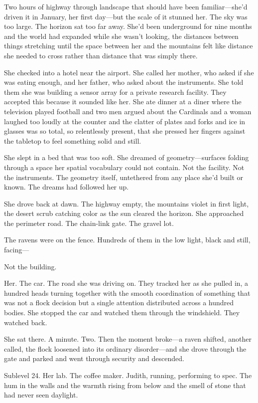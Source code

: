 \documentclass[12pt]{article}
\begin{document}
Two hours of highway through landscape that should have been familiar---she'd driven it in January, her first day---but the scale of it stunned her. The sky was too large. The horizon sat too far away. She'd been underground for nine months and the world had expanded while she wasn't looking, the distances between things stretching until the space between her and the mountains felt like distance she needed to cross rather than distance that was simply there.

She checked into a hotel near the airport. She called her mother, who asked if she was eating enough, and her father, who asked about the instruments. She told them she was building a sensor array for a private research facility. They accepted this because it sounded like her. She ate dinner at a diner where the television played football and two men argued about the Cardinals and a woman laughed too loudly at the counter and the clatter of plates and forks and ice in glasses was so total, so relentlessly present, that she pressed her fingers against the tabletop to feel something solid and still.

She slept in a bed that was too soft. She dreamed of geometry---surfaces folding through a space her spatial vocabulary could not contain. Not the facility. Not the instruments. The geometry itself, untethered from any place she'd built or known. The dreams had followed her up.

She drove back at dawn. The highway empty, the mountains violet in first light, the desert scrub catching color as the sun cleared the horizon. She approached the perimeter road. The chain-link gate. The gravel lot.

The ravens were on the fence. Hundreds of them in the low light, black and still, facing---

Not the building.

Her. The car. The road she was driving on. They tracked her as she pulled in, a hundred heads turning together with the smooth coordination of something that was not a flock decision but a single attention distributed across a hundred bodies. She stopped the car and watched them through the windshield. They watched back.

She sat there. A minute. Two. Then the moment broke---a raven shifted, another called, the flock loosened into its ordinary disorder---and she drove through the gate and parked and went through security and descended.

Sublevel 24. Her lab. The coffee maker. Judith, running, performing to spec. The hum in the walls and the warmth rising from below and the smell of stone that had never seen daylight.
\end{document}
